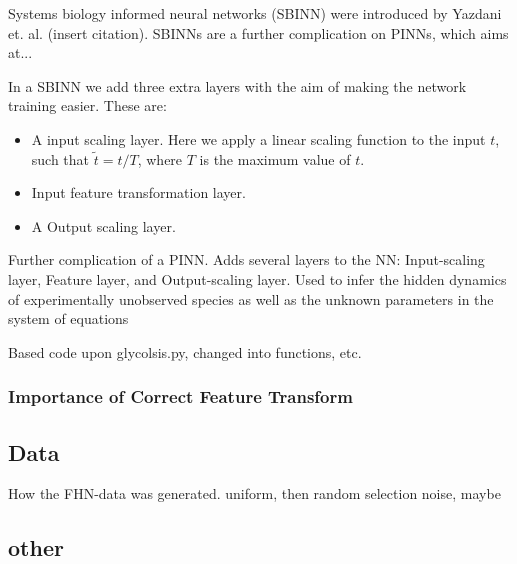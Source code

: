 Systems biology informed neural networks (SBINN) were introduced by Yazdani et. al. (insert citation).
SBINNs are a further complication on PINNs, which aims at...

In a SBINN we add three extra layers with the aim of making the network training easier. These are:
\begin{itemize}
	\item A input scaling layer. Here we apply a linear scaling function to the input $t$, such that $\tilde{t}=t / T$, where $T$ is the maximum value of $t$.
	\item Input feature transformation layer. 
	\item A Output scaling layer.
\end{itemize}


Further complication of a PINN. 
Adds several layers to the NN: Input-scaling layer, Feature layer, and Output-scaling layer.
Used to infer the hidden dynamics of experimentally unobserved species as well as the unknown parameters in the system of equations

Based code upon glycolsis.py, changed into functions, etc.




\subsubsection{Importance of Correct Feature Transform}















\subsection{Data}

How the FHN-data was generated.
uniform, then random selection
noise, maybe




\subsection{other}


















